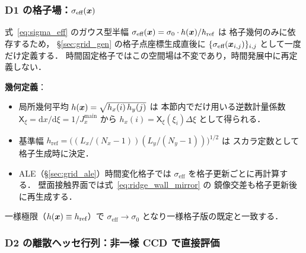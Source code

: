 \subsubsection{\texorpdfstring{D1 の格子場：$\sigma_\text{eff}(\bm{x})$}{D1 の格子場：σ\_eff(x)}}
\label{sec:ridge_nu_sigma_field}

式~\eqref{eq:sigma_eff} のガウス型半幅
$\sigma_\text{eff}(\bm{x}) = \sigma_0 \cdot h(\bm{x})/h_\text{ref}$ は
格子幾何のみに依存するため，
\S\ref{sec:grid_gen} の格子点座標生成直後に
$\{\sigma_\text{eff}(\bm{x}_{i,j})\}_{i,j}$ として一度だけ定義する．
時間固定格子ではこの空間場は不変であり，時間発展中に再定義しない．

\noindent\textbf{幾何定義}：
\begin{itemize}
  \item 局所幾何平均 $h(\bm{x}) = \sqrt{h_x(i)\,h_y(j)}$ は
        本節内でだけ用いる逆数計量係数
        $\mathsf{X}_\xi = \mathrm{d}x/\mathrm{d}\xi = 1/J_x^{\mathrm{main}}$ から
        $h_x(i) = \mathsf{X}_\xi(\xi_i)\Delta\xi$ として得られる．
  \item 基準幅
        $h_\text{ref} = \bigl((L_x/(N_x-1))(L_y/(N_y-1))\bigr)^{1/2}$ は
        スカラ定数として格子生成時に決定．
  \item ALE（\S\ref{sec:grid_ale}）時間変化格子では
        $\sigma_\text{eff}$ を格子更新ごとに再計算する．
        壁面接触界面では式~\eqref{eq:ridge_wall_mirror} の
        鏡像交差も格子更新後に再生成する．
\end{itemize}

一様極限（$h(\bm{x}) \equiv h_\text{ref}$）で
$\sigma_\text{eff} \to \sigma_0$ となり一様格子版の既定と一致する．

\subsubsection{D2 の離散ヘッセ行列：非一様 CCD で直接評価}
\label{sec:ridge_nu_hessian_field}

